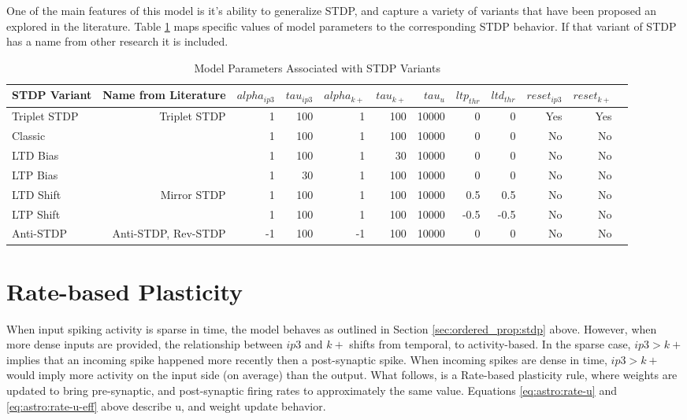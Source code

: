     One of the main features of this model is it's ability to generalize STDP,
    and capture a variety of variants that have been proposed an explored in the
    literature. Table \ref{table:astro_varient_params} maps specific values of
    model parameters to the corresponding STDP behavior. If that
    variant of STDP has a name from other research it is included.

    \begin{table}[!htp]\centering
      \caption{Model Parameters Associated with STDP Variants} \label{table:astro_varient_params}
      \scriptsize
      \begin{tabular}{lrrrrrrrrrrr}\toprule
        STDP Variant &Name from Literature &$alpha_{ip3}$ &$tau_{ip3}$ &$alpha_{k+}$ &$tau_{k+}$ &$tau_u$ &$ltp_{thr}$ &$ltd_{thr}$ &$reset_{ip3}$ &$reset_{k+}$ \\\midrule
        Triplet STDP &Triplet STDP &1 &100 &1 &100 &10000 &0 &0 &Yes &Yes \\
        Classic & &1 &100 &1 &100 &10000 &0 &0 &No &No \\
        LTD Bias & &1 &100 &1 &30 &10000 &0 &0 &No &No \\
        LTP Bias & &1 &30 &1 &100 &10000 &0 &0 &No &No \\
        LTD Shift &Mirror STDP &1 &100 &1 &100 &10000 &0.5 &0.5 &No &No \\
        LTP Shift & &1 &100 &1 &100 &10000 &-0.5 &-0.5 &No &No \\
        Anti-STDP &Anti-STDP, Rev-STDP &-1 &100 &-1 &100 &10000 &0 &0 &No &No \\
        \bottomrule
      \end{tabular}
    \end{table}
    
    \section{Rate-based Plasticity}

    When input spiking activity is sparse in time, the model behaves as outlined
    in Section \ref{sec:ordered_prop:stdp} above. However, when more dense
    inputs are provided, the relationship between $ip3$ and $k+$ shifts from
    temporal, to activity-based. In the sparse case, $ip3 > k+$ implies that an
    incoming spike happened more recently then a post-synaptic spike. When
    incoming spikes are dense in time, $ip3 > k+$ would imply more activity on
    the input side (on average) than the output. What follows, is a Rate-based
    plasticity rule, where weights are updated to bring pre-synaptic, and
    post-synaptic firing rates to approximately the same value. Equations
    \ref{eq:astro:rate-u} and \ref{eq:astro:rate-u-eff} above describe u, and
    weight update behavior.

